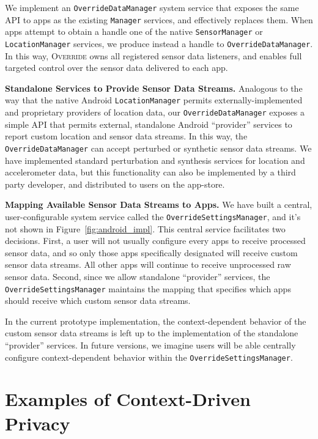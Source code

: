 \documentclass[10pt]{sensys-proc}
\begin{document}
We implement an \texttt{OverrideDataManager} system service that exposes the same API to apps as the existing \texttt{Manager} services, and effectively replaces them. When apps attempt to obtain a handle one of the native \texttt{SensorManager} or \texttt{LocationManager} services, we produce instead a handle to \texttt{OverrideDataManager}. In this way, \textsc{Override} owns all registered sensor data listeners, and enables full targeted control over the sensor data delivered to each app.
 
\textbf{Standalone Services to Provide Sensor Data Streams.} Analogous to the way that the native Android \texttt{LocationManager} permits externally-implemented and proprietary providers of location data, our \texttt{OverrideDataManager} exposes a simple API that permits external, standalone Android ``provider'' services to report custom location and sensor data streams. In this way, the \texttt{OverrideDataManager} can accept perturbed or synthetic sensor data streams. We have implemented standard perturbation and synthesis services for location and accelerometer data, but this functionality can also be implemented by a third party developer, and distributed to users on the app-store.

\textbf{Mapping Available Sensor Data Streams to Apps.} We have built a central, user-configurable system service called the \texttt{OverrideSettingsManager}, and it's not shown in Figure~\ref{fig:android_impl}. This central service facilitates two decisions. First, a user will not usually configure every apps to receive processed sensor data, and so only those apps specifically designated will receive custom sensor data streams.  All other apps will continue to receive unprocessed raw sensor data. Second, since we allow standalone ``provider'' services, the \texttt{OverrideSettingsManager} maintains the mapping that specifies which apps should receive which custom sensor data streams.

In the current prototype implementation, the context-dependent behavior of the custom sensor data streams is left up to the implementation of the standalone ``provider'' services. In future versions, we imagine users will be able centrally configure context-dependent behavior within the \texttt{OverrideSettingsManager}.

\section{Examples of Context-Driven Privacy}
\label{Sec:example}
\end{document}
